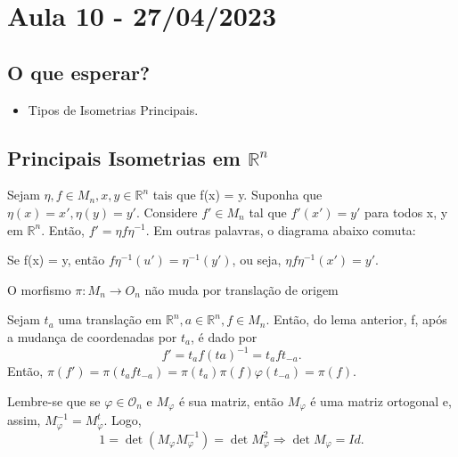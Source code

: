 \documentclass[algebra_notes.tex]{subfiles}
\begin{document}
\section{Aula 10 - 27/04/2023}
\subsection{O que esperar?}
\begin{itemize}
	\item Tipos de Isometrias Principais.
\end{itemize}
\subsection{Principais Isometrias em $\mathbb{R}^{n}$}
\begin{lemma*}
	Sejam $\eta, f\in M_{n}, x, y\in \mathbb{R}^{n}$ tais que f(x) = y. Suponha que $\eta(x) = x', \eta(y) = y'.$
	Considere $f'\in M_{n}$ tal que $f'(x')=y'$ para todos x, y em $\mathbb{R}^{n}.$ Então, $f' = \eta f\eta^{-1}$.
	Em outras palavras, o diagrama abaixo comuta:
	\begin{center}
	\end{center}
\end{lemma*}
\begin{proof*}
	Se f(x) = y, então $f\eta ^{-1}(u') = \eta ^{-1}(y')$, ou seja, $\eta f\eta ^{-1}(x')=y'$. \qedsymbol
\end{proof*}
\begin{crl*}
	O morfismo $\pi :M_{n}\rightarrow O_{n}$ não muda por translação de origem
\end{crl*}
\begin{proof*}
	Sejam $t_{a}$ uma translação em $\mathbb{R}^{n}, a\in \mathbb{R}^{n}, f\in M_{n}$. Então, do lema anterior, f,
	após a mudança de coordenadas por $t_{a}$, é dado por
	$$
		f'=t_{a}f(ta)^{-1} = t_{a}ft_{-a}.
	$$
	Então, $\pi (f') = \pi (t_{a}ft_{-a}) = \pi (t_{a})\pi (f)\varphi (t_{-a}) = \pi (f).$ \qedsymbol
\end{proof*}
Lembre-se que se $\varphi \in \mathcal{O}_{n}$ e $M_{\varphi }$ é sua matriz, então $M_{\varphi }$ é uma matriz ortogonal e,
assim, $M_{\varphi }^{-1} = M_{\varphi }^{t}.$ Logo,
$$
	1 = \det{(M_{\varphi }M_{\varphi }^{-1})} = \det{M_{\varphi }^{2}} \Rightarrow \det{M_{\varphi }} = Id.
$$
\end{document}
